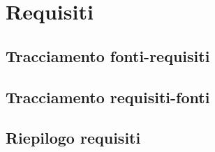 \documentclass[a4paper,titlepage]{article}
\begin{document}
 \section{Requisiti}
  
  
  \subsection{Tracciamento fonti-requisiti}
   
  \subsection{Tracciamento requisiti-fonti}
   
  \subsection{Riepilogo requisiti}
   
\end{document}
